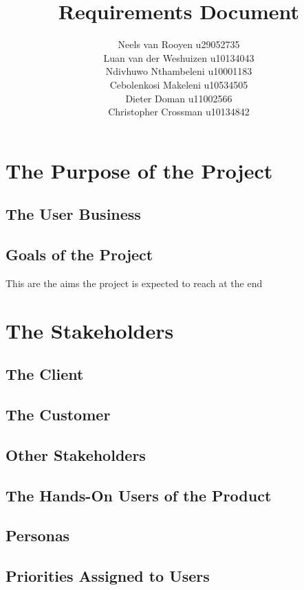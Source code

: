 \documentclass[12pt,a4paper]{article}
\begin{document}
\title{Requirements Document}
\author{Neels van Rooyen u29052735\\
Luan van der Weshuizen u10134043\\
Ndivhuwo Nthambeleni u10001183\\
Cebolenkosi Makeleni u10534505\\
Dieter Doman u11002566\\
Christopher Crossman u10134842}
\maketitle
\pagebreak
\section{The Purpose of the Project}
\subsection{The User Business}
\paragraph{}
\subsection{Goals of the Project}
This are the aims the project is expected to reach at the end
\pagebreak
\section{The Stakeholders}
\subsection{The Client}
\subsection{The Customer}
\subsection{Other Stakeholders}
\subsection{The Hands-On Users of the Product}
\subsection{Personas}
\subsection{Priorities Assigned to Users}
\end{document}
